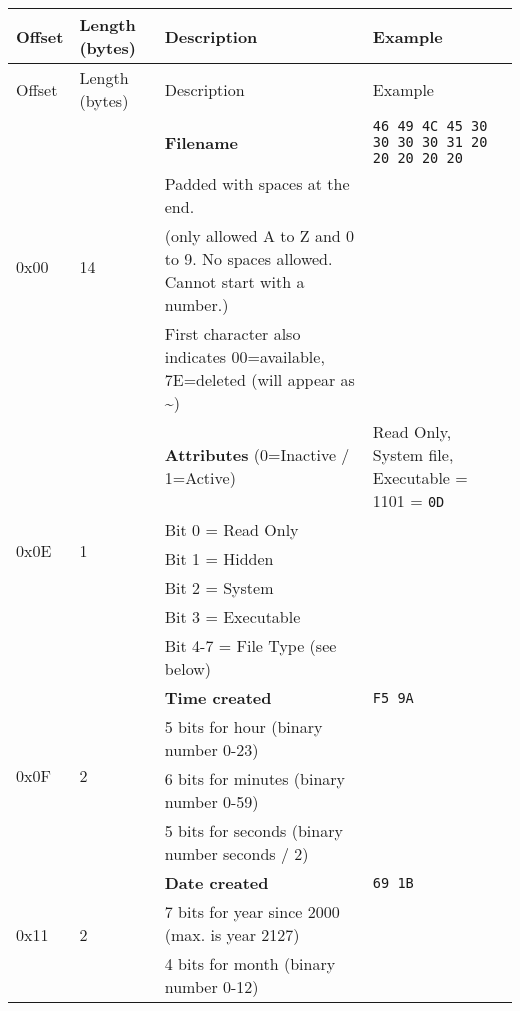        \begin{longtable}{ |m{1cm}|m{1.3cm}|m{6.8cm}|m{2.7cm}| }
            \hline
            \rowcolor{lightgray}
            Offset & Length (bytes) & Description & Example\\
            \hline
            \endfirsthead

            \hline
            \rowcolor{lightgray}
            Offset & Length (bytes) & Description & Example\\
            \hline
            \endhead

            \multirow{4}{4em}{0x00} & \multirow{4}{4em}{14} & \textbf{Filename}
            & \texttt{46 49 4C 45 30 30 30 30 31 20 20 20 20 20}\\
            & & Padded with spaces at the end. &\\
            & & (only allowed A to Z and 0 to 9. No spaces allowed. Cannot start
            with a number.) &\\
            & & First character also indicates 00=available, 7E=deleted (will
            appear as \textasciitilde) &\\
            \hline
            \multirow{6}{4em}{0x0E} & \multirow{6}{4em}{1} & \textbf{Attributes}
            (0=Inactive / 1=Active)
            & Read Only, System file, Executable = 1101 = \texttt{0D}\\
            & & Bit 0 = Read Only &\\
            & & Bit 1 = Hidden &\\
            & & Bit 2 = System &\\
            & & Bit 3 = Executable &\\
            & & Bit 4-7 = File Type (see below) &\\
            \hline
            \multirow{4}{4em}{0x0F} & \multirow{4}{4em}{2} & \textbf{Time created}
            & \texttt{F5 9A}\\
            & & 5 bits for hour (binary number 0-23) &\\
            & & 6 bits for minutes (binary number 0-59) &\\
            & & 5 bits for seconds (binary number seconds / 2) &\\
            \hline
            \multirow{4}{4em}{0x11} & \multirow{4}{4em}{2} & \textbf{Date created}
            & \texttt{69 1B}\\
            & & 7 bits for year since 2000 (max. is year 2127) &\\
            & & 4 bits for month (binary number 0-12) &\\

\end{longtable}
